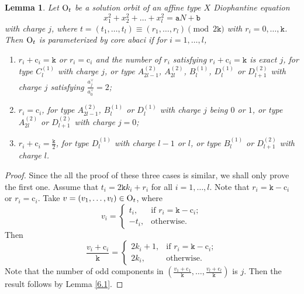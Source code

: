 \documentclass[11pt]{amsart}
\theoremstyle{plain}
\numberwithin{equation}{subsection}
\newtheorem{lemma}[theorem]{Lemma}
\begin{document}
\begin{lemma}\label{6.2}
Let ${\rm O}_t$ be a solution orbit of an affine type $X$ Diophantine equation $$x_1^2+x_2^2+\dots+x_l^2=\mathtt{a}N+\mathtt{b}$$ with charge $j$, where 
$t=(t_1, \dots, t_l)\equiv (r_1, \dots, r_l) \pmod {2\mathtt{k}}$ with $r_i=0, \dots, \mathtt{k}$. 
Then ${\rm O}_t$ is parameterized by core abaci if for $i=1, \dots, l$,
\begin{enumerate}
\item [{\rm (1)}] $r_i+\mathrm{c}_i=\mathtt{k}$ or $r_i=\mathrm{c}_i$ and the number of 
$r_i$ satisfying $r_i+\mathrm{c}_i=\mathtt{k}$ is exact $j$, for type
$C_l^{(1)}$ with charge $j$, or type $A_{2l-1}^{(2)}$, $A_{2l}^{(2)}$, $B_l^{(1)}$, $D_l^{(1)}$ 
or $D_{l+1}^{(2)}$ with charge $j$ satisfying $\frac{a_j^\vee}{a_0^\vee}=2$; 
\item [{\rm (2)}] $r_i=\mathrm{c}_i$, for type
  $A_{2l-1}^{(2)}$, $B_l^{(1)}$ or $D_l^{(1)}$ with charge $j$ being $0$ or $1$, or type $A_{2l}^{(2)}$ or $D_{l+1}^{(2)}$ with charge $j=0$;
\item [{\rm (3)}] $r_i+\mathrm{c}_i=\frac{\mathtt{k}}{2}$, for type
$D_l^{(1)}$ with charge $l-1$ or $l$, or type $B_{l}^{(1)}$ or $D_{l+1}^{(2)}$ with charge $l$.
\end{enumerate}
\end{lemma}

\begin{proof}
Since the all the proof of these three cases is similar, we shall only prove the first one.
Assume that $t_i=2\mathtt{k}k_i+r_i$ for all $i=1, \dots, l$.
Note that  $r_i=\mathtt{k}-\mathrm{c}_i$ or  $r_i=\mathrm{c}_i$.
Take $v=(v_1, \dots, v_l)\in {\rm O}_t$, where
$$v_i=\begin{cases}
       t_i, & \mbox{if } r_i=\mathtt{k}-\mathrm{c}_i; \\
       -t_i, & \mbox{otherwise}.
     \end{cases}$$
Then $$\frac{v_i+\mathrm{c}_i}{\mathtt{k}}=\begin{cases}
       2k_i+1, & \mbox{if } r_i=\mathtt{k}-\mathrm{c}_i; \\
       2k_i, & \mbox{otherwise}.
     \end{cases}$$
Note that the number of odd components in $(\frac{v_1+\mathrm{c}_1}{\mathtt{k}}, \dots, \frac{v_l+\mathrm{c}_l}{\mathtt{k}})$ is $j$. 
Then the result follows by Lemma \ref{6.1}.
\end{proof}
\end{document}
